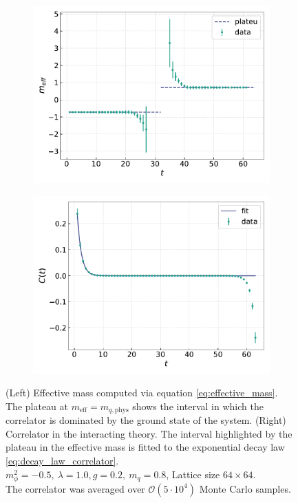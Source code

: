 \begin{figure}[h!]
    \centering
    \begin{subfigure}{0.45\textwidth}
        \includegraphics[width=\textwidth]{figures/effmass/effmass.pdf}
    \end{subfigure}
    \begin{subfigure}{0.45\textwidth}
        \includegraphics[width=\textwidth]{figures/effmass/corr.pdf}
    \end{subfigure}
    \caption[Effective mass]{(Left) Effective mass computed via equation \eqref{eq:effective_mass}. The plateau at $m_\text{eff} = m_{q, \text{phys}}$ shows the interval in which the correlator is dominated by the ground state of the system. (Right) Correlator in the interacting theory. The interval highlighted by the plateau in the effective mass is fitted to the exponential decay law \eqref{eq:decay_law_correlator}. \\ 
    $m_\phi^2=-0.5, \ \lambda=1.0, g=0.2, \ m_q = 0.8$, Lattice size $64 \times 64$. \\ The correlator was averaged over $\mathcal{O}(5 \cdot 10^4)$ Monte Carlo samples.}
    \label{fig:effective_mass}
\end{figure}


